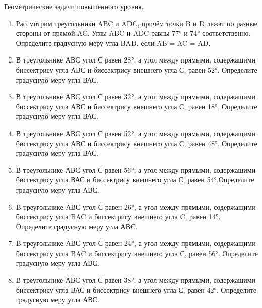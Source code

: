 \documentclass[a4paper,12pt]{article}
\newcommand{\taskspace}{\par\vspace{0.42cm}}
\newcommand{\blocknote}[1]{%
  {\color{soft}\small #1\par}\vspace{0.25cm}%
}
\begin{document}
\blocknote{Геометрические задачи повышенного уровня.}

\begin{enumerate}[resume]

\item Рассмотрим треугольники ABC и ADC, причём точки B и D лежат по разные стороны от прямой AC. Углы ABC и ADC равны 77° и 74° соответственно. Определите градусную меру угла BAD, если AB = AC = AD.

\taskspace

\item В треугольнике АВС угол С равен 28°, а угол между прямыми, содержащими биссектрису угла АВС и биссектрису внешнего угла С, равен 52°. Определите градусную меру угла ВАС.

\taskspace

\item В треугольнике АВС угол С равен 32°, а угол между прямыми, содержащими биссектрису угла АВС и биссектрису внешнего угла С, равен 18°. Определите градусную меру угла ВАС.

\taskspace

\item В треугольнике АВС угол С равен 52°, а угол между прямыми, содержащими биссектрису угла АВС и биссектрису внешнего угла С, равен 48°. Определите градусную меру угла ВАС.

\taskspace

\item В треугольнике АВС угол С равен 56°, а угол между прямыми, содержащими биссектрису угла ВАС и биссектрису внешнего угла С, равен 54°.Определите градусную меру угла АВС.

\taskspace

\item B треугольнике АВС угол С равен 26°, а угол между прямыми, содержащими биссектрису угла BAC и биссектрису внешнего угла C, равен 14°. Определите градусную меру угла АВС.

\taskspace

\item B треугольнике АВС угол С равен 24°, а угол между прямыми, содержащими биссектрису угла BAC и биссектрису внешнего угла С, равен 56°. Определите градусную меру угла АВС.

\taskspace

\item В треугольнике АВС угол С равен 38°, а угол между прямыми, содержащими биссектрису угла ВАС и биссектрису внешнего угла С, равен 42°. Определите градусную меру угла АВС.


\end{enumerate}
\end{document}
